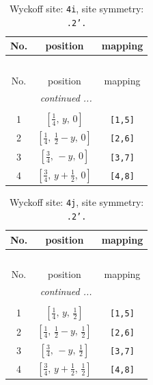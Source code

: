 \documentclass[fleqn,8pt]{jsarticle}
\begin{document}
\renewcommand{\arraystretch}{1.2}
\begin{longtable}{ccc}
\caption{Wyckoff site: {\tt 4i}, site symmetry: {\tt .2'.}}
 \\
 \hline \hline
No. & position & mapping \\ \hline \endfirsthead

\multicolumn{2}{l}{\tablename\ \thetable{}} \\
 \hline \hline
No. & position & mapping \\ \hline \endhead

 \hline \hline
\multicolumn{2}{r}{\footnotesize\it continued ...} \\ \endfoot

 \hline \hline
\multicolumn{2}{r}{} \\ \endlastfoot

1 & $\left[ \frac{1}{4},\, y,\, 0 \right]$ & {\tt [1,5]} \\ \hline
2 & $\left[ \frac{1}{4},\, \frac{1}{2} - y,\, 0 \right]$ & {\tt [2,6]} \\ \hline
3 & $\left[ \frac{3}{4},\, - y,\, 0 \right]$ & {\tt [3,7]} \\ \hline
4 & $\left[ \frac{3}{4},\, y + \frac{1}{2},\, 0 \right]$ & {\tt [4,8]} \\
\end{longtable}
\renewcommand{\arraystretch}{1.2}
\begin{longtable}{ccc}
\caption{Wyckoff site: {\tt 4j}, site symmetry: {\tt .2'.}}
 \\
 \hline \hline
No. & position & mapping \\ \hline \endfirsthead

\multicolumn{2}{l}{\tablename\ \thetable{}} \\
 \hline \hline
No. & position & mapping \\ \hline \endhead

 \hline \hline
\multicolumn{2}{r}{\footnotesize\it continued ...} \\ \endfoot

 \hline \hline
\multicolumn{2}{r}{} \\ \endlastfoot

1 & $\left[ \frac{1}{4},\, y,\, \frac{1}{2} \right]$ & {\tt [1,5]} \\ \hline
2 & $\left[ \frac{1}{4},\, \frac{1}{2} - y,\, \frac{1}{2} \right]$ & {\tt [2,6]} \\ \hline
3 & $\left[ \frac{3}{4},\, - y,\, \frac{1}{2} \right]$ & {\tt [3,7]} \\ \hline
4 & $\left[ \frac{3}{4},\, y + \frac{1}{2},\, \frac{1}{2} \right]$ & {\tt [4,8]} \\
\end{longtable}
\end{document}
